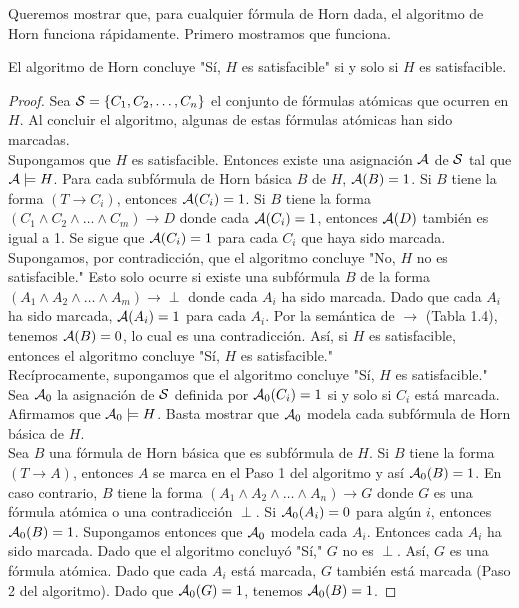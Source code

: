 \message{ !name(main.tex)}\documentclass[12pt,a4paper]{book}
\newcommand{\comillas}[1]{"#1"}
\begin{document}
    Queremos mostrar que, para cualquier fórmula de Horn dada, el algoritmo de Horn funciona rápidamente. Primero mostramos
    que funciona.

    \begin{proposicion}\label{prop:algoritmo-horn-correcto}
        El algoritmo de Horn concluye \comillas{Sí, $H$ es satisfacible} si y solo si $H$ es satisfacible.
    \end{proposicion}
    \begin{proof}
        Sea $\SS=\{C_{1},C_{2},\dots,C_{n}\}$ el conjunto de fórmulas atómicas que ocurren en $H$. Al concluir el algoritmo,
        algunas de estas fórmulas atómicas han sido marcadas.\\
        Supongamos que $H$ es satisfacible. Entonces existe una asignación $\AA$ de $\SS$ tal que $\AA\models H$. Para cada
        subfórmula de Horn básica $B$ de $H$, $\AA(B)=1$. Si $B$ tiene la forma $(T\rightarrow C_{i})$, entonces
        $\AA(C_{i})=1$. Si $B$ tiene la forma $(C_{1}\wedge C_{2}\wedge\dots\wedge C_{m})\rightarrow D$ donde cada
        $\AA(C_{i})=1$, entonces $\AA(D)$ también es igual a 1. Se sigue que $\AA(C_{i})=1$ para cada $C_{i}$ que haya sido
        marcada.\\
        Supongamos, por contradicción, que el algoritmo concluye \comillas{No, $H$ no es satisfacible.} Esto solo ocurre si
        existe una subfórmula $B$ de la forma $(A_{1}\wedge A_{2}\wedge\dots\wedge A_{m})\rightarrow\perp$ donde cada
        $A_{i}$ ha sido marcada. Dado que cada $A_{i}$ ha sido marcada, $\AA(A_{i})=1$ para cada $A_{i}$. Por la semántica de
        $\rightarrow$ (Tabla 1.4), tenemos $\AA(B)=0$, lo cual es una contradicción. Así, si $H$ es satisfacible, entonces el
        algoritmo concluye \comillas{Sí, $H$ es satisfacible.}\\
        Recíprocamente, supongamos que el algoritmo concluye \comillas{Sí, $H$ es satisfacible.} Sea $\AA_{0}$ la asignación
        de $\SS$ definida por $\AA_{0}(C_{i})=1$ si y solo si $C_{i}$ está marcada. Afirmamos que $\AA_{0}\models H$. Basta
        mostrar que $\AA_{0}$ modela cada subfórmula de Horn básica de $H$.\\
        Sea $B$ una fórmula de Horn básica que es subfórmula de $H$. Si $B$ tiene la forma $(T\rightarrow A)$, entonces $A$
        se marca en el Paso 1 del algoritmo y así $\AA_{0}(B)=1$. En caso contrario, $B$ tiene la forma
        $(A_{1}\wedge A_{2}\wedge\dots\wedge A_{n})\rightarrow G$ donde $G$ es una fórmula atómica o una contradicción
        $\perp$. Si $\AA_{0}(A_{i})=0$ para algún $i$, entonces $\AA_{0}(B)=1$. Supongamos entonces que $\AA_{0}$ modela cada
        $A_{i}$. Entonces cada $A_{i}$ ha sido marcada. Dado que el algoritmo concluyó \comillas{Sí,} $G$ no es $\perp$. Así,
        $G$ es una fórmula atómica. Dado que cada $A_{i}$ está marcada, $G$ también está marcada (Paso 2 del algoritmo).
        Dado que $\AA_{0}(G)=1$, tenemos $\AA_{0}(B)=1$.
    \end{proof}
\end{document}
